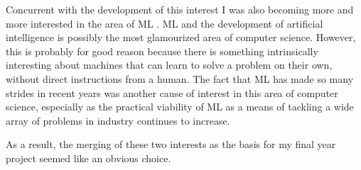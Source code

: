 Concurrent with the development of this interest I was also becoming more and more interested in the area
of ML .
ML and the development of artificial intelligence is possibly the most glamourized area
of computer science.
However, this is probably for good reason because there is something intrinsically interesting
about machines that can learn to solve a problem on their own, without direct instructions from a human.
The fact that ML has made so many strides in recent years was another cause of interest in
this area of computer science, especially as the practical viability of ML as a means of tackling a wide array
of problems in industry continues to increase.

As a result, the merging of these two interests as the basis for my final year project seemed like an obvious choice.